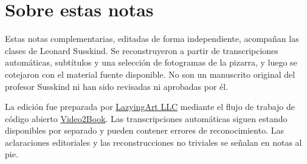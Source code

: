 \documentclass[11pt,oneside]{book}
\begin{document}
\frontmatter
\hypersetup{pageanchor=false}

\hypersetup{pageanchor=true}

\clearpage
\chapter*{Sobre estas notas}
Estas notas complementarias, editadas de forma independiente, acompañan las clases de Leonard Susskind. Se reconstruyeron a partir de transcripciones automáticas, subtítulos y una selección de fotogramas de la pizarra, y luego se cotejaron con el material fuente disponible. No son un manuscrito original del profesor Susskind ni han sido revisadas ni aprobadas por él.

La edición fue preparada por \href{https://lazying.art}{LazyingArt LLC} mediante el flujo de trabajo de código abierto \href{https://github.com/lachlanchen/Video2Book}{Video2Book}. Las transcripciones automáticas siguen estando disponibles por separado y pueden contener errores de reconocimiento. Las aclaraciones editoriales y las reconstrucciones no triviales se señalan en notas al pie.
\clearpage
\tableofcontents
\mainmatter








\end{document}
